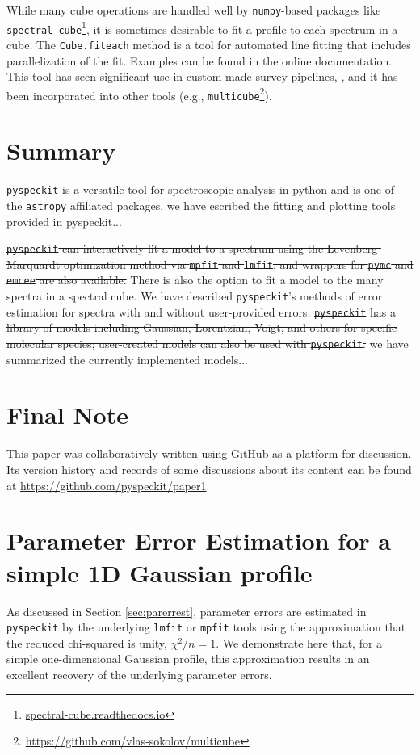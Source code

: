 \documentclass[twocolumn]{aastex62}
\newcommand{\pyspeckit}{\texttt{pyspeckit}\xspace}
\newcommand{\astropy}{\texttt{astropy}\xspace}
\begin{document}
While many cube operations are handled well by \texttt{numpy}-based packages
like \texttt{spectral-cube}\footnote{\url{spectral-cube.readthedocs.io}},
it is sometimes desirable to fit a profile to each spectrum
in a cube.  The \texttt{Cube.fiteach} method is a tool for automated line
fitting that includes parallelization of the fit.  Examples can be
found in the online documentation. 
This tool  has  seen significant use in 
custom made survey pipelines, 
\citep[e.g.][\url{https://github.com/GBTAmmoniaSurvey/GAS}]{Friesen2017-GAS}, 
 and it has been incorporated into other tools (e.g.,
\texttt{multicube}\footnote{\url{https://github.com/vlas-sokolov/multicube}}).


\section{Summary}
\texttt{pyspeckit} is a versatile tool for spectroscopic analysis in python and
is one of the \astropy affiliated packages.
{\color{red} we have escribed the fitting and plotting tools provided in pyspeckit...}

\sout{\pyspeckit can interactively fit a
model to a spectrum using the Levenberg-Marquardt optimization method via
\texttt{mpfit} and \texttt{lmfit}, and wrappers for \texttt{pymc} and
\texttt{emcee} are also available.}
There is also the option to fit a model to
the many spectra in a spectral cube. We have described \pyspeckit's methods of
error estimation for spectra with and without user-provided errors. 
\sout{\pyspeckit
has a library of models including Gaussian, Lorentzian, Voigt, and others for
specific molecular species; user-created models can also be used with
\pyspeckit.}
{\color{red} we have summarized the currently implemented models...}

\section{Final Note}
This paper was collaboratively written using GitHub as a platform for
discussion.  Its version history and records of some discussions about its
content can be found at \url{https://github.com/pyspeckit/paper1}.




\appendix
\section{Parameter Error Estimation for a simple 1D Gaussian profile}
\label{appendix:parerrest}
As discussed in Section \ref{sec:parerrest}, parameter errors are estimated in
\pyspeckit by the underlying \texttt{lmfit} or \texttt{mpfit} tools using the
approximation that the reduced chi-squared is unity, $\chi^2/n=1$.  We
demonstrate here that, for a simple one-dimensional Gaussian profile, this
approximation results in an excellent recovery of the
underlying parameter errors.
\end{document}
